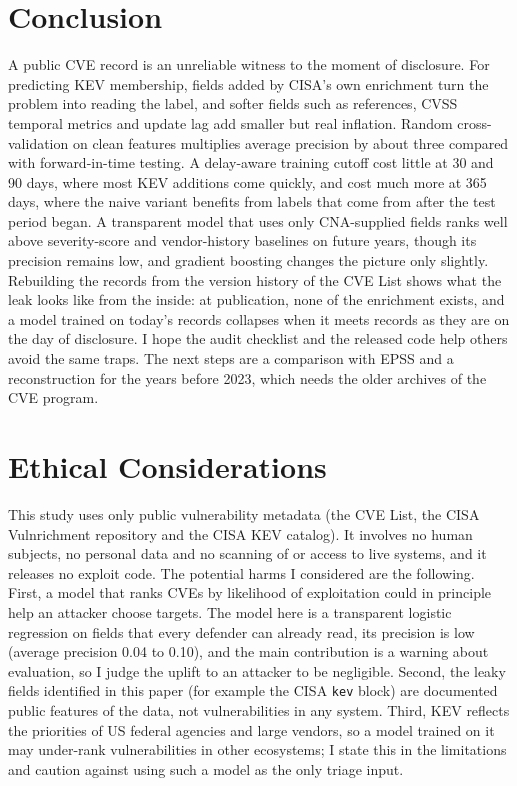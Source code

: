 \documentclass[conference,a4paper]{IEEEtran}
\begin{document}
\section{Conclusion}

A public CVE record is an unreliable witness to the moment of disclosure. For predicting KEV membership, fields added by CISA's own enrichment turn the problem into reading the label, and softer fields such as references, CVSS temporal metrics and update lag add smaller but real inflation. Random cross-validation on clean features multiplies average precision by about three compared with forward-in-time testing. A delay-aware training cutoff cost little at 30 and 90 days, where most KEV additions come quickly, and cost much more at 365 days, where the naive variant benefits from labels that come from after the test period began. A transparent model that uses only CNA-supplied fields ranks well above severity-score and vendor-history baselines on future years, though its precision remains low, and gradient boosting changes the picture only slightly. Rebuilding the records from the version history of the CVE List shows what the leak looks like from the inside: at publication, none of the enrichment exists, and a model trained on today's records collapses when it meets records as they are on the day of disclosure. I hope the audit checklist and the released code help others avoid the same traps. The next steps are a comparison with EPSS and a reconstruction for the years before 2023, which needs the older archives of the CVE program.

\section*{Ethical Considerations}

This study uses only public vulnerability metadata (the CVE List, the CISA Vulnrichment repository and the CISA KEV catalog). It involves no human subjects, no personal data and no scanning of or access to live systems, and it releases no exploit code. The potential harms I considered are the following. First, a model that ranks CVEs by likelihood of exploitation could in principle help an attacker choose targets. The model here is a transparent logistic regression on fields that every defender can already read, its precision is low (average precision 0.04 to 0.10), and the main contribution is a warning about evaluation, so I judge the uplift to an attacker to be negligible. Second, the leaky fields identified in this paper (for example the CISA \texttt{kev} block) are documented public features of the data, not vulnerabilities in any system. Third, KEV reflects the priorities of US federal agencies and large vendors, so a model trained on it may under-rank vulnerabilities in other ecosystems; I state this in the limitations and caution against using such a model as the only triage input.
\end{document}
